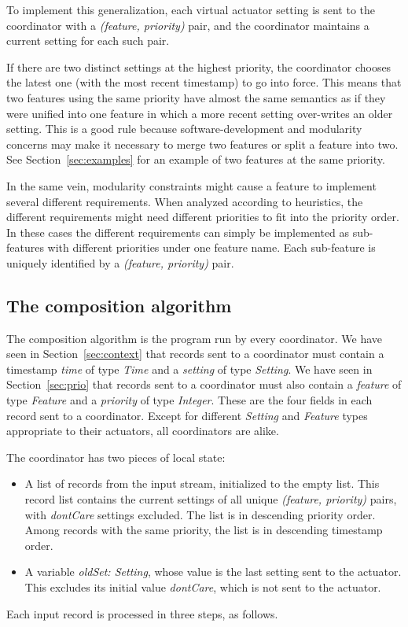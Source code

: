 \documentclass[conference]{IEEEtran}
\begin{document}
To implement this generalization, each virtual actuator setting is
sent to the coordinator with a {\it (feature, priority)} pair, and
the coordinator maintains a current setting for each such pair.

If there are two distinct settings at the highest priority, the 
coordinator chooses the latest one (with the most recent timestamp)
to go into force.
This means that two features using the same priority have almost the
same semantics as if they were unified into one feature in which a
more recent setting over-writes an older setting.
This is a good rule because software-development and modularity
concerns may make it necessary to merge two features or split a
feature into two.
See Section~\ref{sec:examples} for an example of two features at the
same priority.

In the same vein,
modularity
constraints might cause a feature to implement
several different requirements.
When analyzed according to heuristics, the different requirements might
need different priorities to fit into the priority order.
In these cases the different requirements can simply be implemented as 
sub-features with different priorities under one feature name.
Each sub-feature is uniquely identified by a {\it (feature, priority)}
pair.

\subsection{The composition algorithm}
\label{sec:compos}

The composition algorithm is the program run by
every coordinator.
We have seen in Section~\ref{sec:context} that records sent to a 
coordinator
must contain a timestamp {\it time} of type {\it Time}
and a {\it setting} of type {\it Setting}.
We have seen in Section~\ref{sec:prio} 
that records sent to a coordinator
must also contain a {\it feature} of type {\it Feature}
and a {\it priority} of type {\it Integer}.
These are the four fields in each record sent to a coordinator.
Except for different {\it Setting} and {\it Feature} types appropriate
to their actuators, all coordinators are alike.

The coordinator has two pieces of local state:
\begin{itemize}
\item
A list of records from the input stream, initialized
to the empty list.
This record list
contains the current settings of all unique {\it (feature, priority)}
pairs, with {\it dontCare} settings excluded.
The list is in descending priority order.
Among records with the same priority, the list is in 
descending timestamp order.
\item
A variable {\it oldSet: Setting}, whose value is the
last setting sent to the actuator.
This excludes its initial value 
{\it dontCare}, which is not sent to the actuator.
\end{itemize}
Each input record is processed in three steps, as follows.
\end{document}
